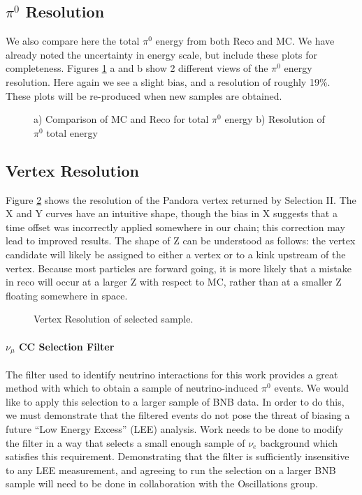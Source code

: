 \documentclass[a4paper]{article}
\begin{document}
\subsection{$\pi^0$ Resolution}
We also compare here the total $\pi^0$ energy from both Reco and MC. We have already noted the uncertainty in energy scale, but include these plots for completeness. Figures \ref{fig:pi0_res} a and b show 2 different views of the $\pi^0$ energy resolution.  Here again we see a slight bias, and a resolution of roughly 19\%.  These plots will be re-produced when new samples are obtained. 



\begin{figure}[h!]
\centering
{}
\hspace{1 mm}
\caption{ a) Comparison of MC and Reco for total $\pi^0$ energy b) Resolution of $\pi^0$ total energy }
\label{fig:pi0_res}
\end{figure}


\subsection{Vertex Resolution}
\par Figure \ref{fig:vtx_res} shows the resolution of the Pandora vertex returned by Selection II. The X and Y curves have an intuitive shape, though the bias in X suggests that a time offset was incorrectly applied somewhere in our chain; this correction may lead to improved results.  The shape of Z can be understood as follows: the vertex candidate will likely be assigned to either a vertex or to a kink upstream of the vertex.  Because most particles are forward going, it is more likely that a mistake in reco will occur at a larger Z with respect to MC, rather than at a smaller Z floating somewhere in space.

\begin{figure}[h!]
\centering
{}
\caption{Vertex Resolution of selected sample. }
\label{fig:vtx_res}
\end{figure}


\paragraph{$\nu_{\mu}$ CC Selection Filter} The filter used to identify neutrino interactions for this work provides a great method with which to obtain a sample of neutrino-induced $\pi^0$ events. We would like to apply this selection to a larger sample of BNB data. In order to do this, we must demonstrate that the filtered events do not pose the threat of biasing a future ``Low Energy Excess'' (LEE) analysis. Work needs to be done to modify the filter in a way that selects a small enough sample of $\nu_e$ background which satisfies this requirement. Demonstrating that the filter is sufficiently insensitive to any LEE measurement, and agreeing to run the selection on a larger BNB sample will need to be done in collaboration with the Oscillations group.
\end{document}
